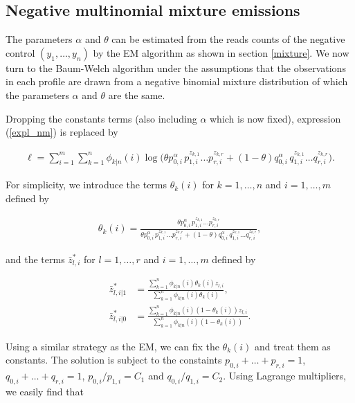 \documentclass[12pt]{article}
\begin{document}
\begin{appendices}
    \section{Negative multinomial mixture emissions}

    The parameters $\alpha$ and $\theta$ can be estimated from the
    reads counts of the negative control $(y_1, \ldots, y_n)$ by
    the EM algorithm as shown in section \ref{mixture}. We now
    turn to the Baum-Welch algorithm under the assumptions that
    the observations in each profile are drawn from a negative
    binomial mixture distribution of which the parameters $\alpha$
    and $\theta$ are the same.

    Dropping the constants terms (also including $\alpha$ which is
    now fixed), expression (\ref{expl_nm}) is replaced by

    \begin{align*}
    \ell = \sum_{i=1}^m\sum_{k=1}^n \phi_{k|n}(i)
      \log\Big(\theta p_{0,i}^{\alpha} \, p_{1,i}^{z_{k,1}} \ldots 
      p_{r,i}^{z_{k,r}} +
      (1-\theta) q_{0,i}^{\alpha} \, q_{1,i}^{z_{k,1}} \ldots
      q_{r,i}^{z_{k,r}} \Big).
    \end{align*}

    For simplicity, we introduce the terms $\theta_k(i)$ for
    $k = 1, \ldots, n$ and $i = 1, \ldots, m$ defined by
  
    \begin{align}
    \theta_k(i) = \frac{\theta p_{0,i}^{\alpha} \, p_{1,i}^{z_{k,1}}
    \ldots p_{r,i}^{z_{k,r}}}
    {\theta p_{0,i}^{\alpha} \, p_{1,i}^{z_{k,1}}
    \ldots p_{r,i}^{z_{k,r}} + (1-\theta) q_{0,i}^{\alpha} \,
    q_{1,i}^{z_{k,1}} \ldots q_{r,i}^{z_{k,r}}},
\label{thetaki}
    \end{align}

\noindent
    and the terms $\bar{z}_{l,i}^*$ for $l = 1, \ldots, r$ and
    $i = 1, \ldots, m$ defined by

    \begin{align*}
    \bar{z}_{l,i|1}^* &= \frac{\sum_{k=1}^n\phi_{k|n}(i)
      \theta_k(i)z_{l,i}}{\sum_{k=1}^n\phi_{k|n}(i)\theta_k(i)}, \\
    \bar{z}_{l,i|0}^* &= \frac{\sum_{k=1}^n\phi_{k|n}(i)
      (1-\theta_k(i))z_{l,i}}{\sum_{k=1}^n\phi_{k|n}(i)(1-\theta_k(i))}.
    \end{align*}

    Using a similar strategy as the EM, we can fix the $\theta_k(i)$
    and treat them as constants. The solution is subject to the
    constaints $p_{0,i}+\ldots+p_{r,i} = 1$,
    $q_{0,i}+\ldots+q_{r,i} = 1$, $p_{0,i}/p_{1,i} = C_1$ and
    $q_{0,i}/q_{1,i} = C_2$. Using Lagrange multipliers, we easily
    find that


\end{appendices}
\end{document}
